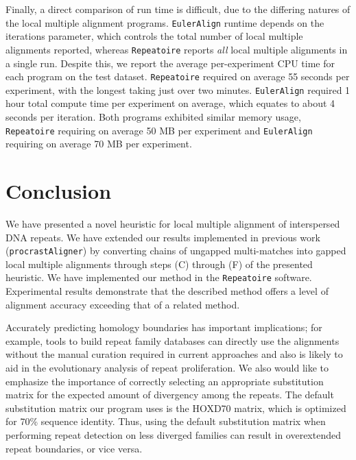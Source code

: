 \documentclass[12pt,journal,letterpaper,onecolumn, draftcls]{IEEEtran}
\begin{document}


Finally, a direct comparison of run time is difficult, due to the differing natures of the local multiple alignment programs.  \texttt{EulerAlign} runtime depends on the iterations parameter, which controls the total number of local multiple alignments reported, whereas \texttt{Repeatoire} reports \textit{all} local multiple alignments in a single run.  Despite this, we report the average per-experiment CPU time for each program on the test dataset. \texttt{Repeatoire} required on average 55 seconds per experiment, with the longest taking just over two minutes. \texttt{EulerAlign} required 1 hour total compute time per experiment on average, which equates to about 4 seconds per iteration.  Both programs exhibited similar memory usage, \texttt{Repeatoire} requiring on average 50 MB per experiment and \texttt{EulerAlign} requiring on average 70 MB per experiment.


\section{Conclusion}
We have presented a novel heuristic for local multiple alignment of interspersed DNA repeats. We have extended our results implemented in previous work (\texttt{procrastAligner}) by
converting chains of ungapped multi-matches into gapped local multiple
alignments through steps (C) through (F) of the presented heuristic. We have implemented our method in the \texttt{Repeatoire} software. Experimental results demonstrate that the
described method offers a level of alignment accuracy exceeding
that of a related method.

Accurately predicting homology boundaries has important implications; for example, tools to build repeat family databases can directly use the alignments without the manual curation required in current approaches and also is likely to aid in the evolutionary analysis of repeat proliferation.  We also would like to emphasize the importance of correctly selecting an appropriate substitution matrix for the expected amount of divergency among the repeats. The default substitution matrix our program uses is the HOXD70 matrix, which is optimized for 70\% sequence identity. Thus, using the default substitution matrix when performing repeat detection on less diverged families can result in overextended repeat boundaries, or vice versa.
\end{document}
